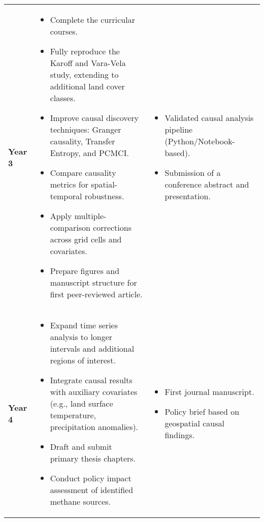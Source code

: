 \begin{longtable}{@{} >{\centering\arraybackslash}p{3cm} >{\centering\arraybackslash}p{8cm} >{\centering\arraybackslash}p{3cm} @{}}
\addlinespace[0.8em]
\textbf{Year 3} & 
\begin{minipage}[t]{8cm}\centering
\begin{itemize}[left=0pt, labelsep=4pt, itemsep=2pt]
    \item Complete the curricular courses.
    \item Fully reproduce the Karoff and Vara-Vela study, extending to additional land cover classes.
    \item Improve causal discovery techniques: Granger causality, Transfer Entropy, and PCMCI.
    \item Compare causality metrics for spatial-temporal robustness.
    \item Apply multiple-comparison corrections across grid cells and covariates.
    \item Prepare figures and manuscript structure for first peer-reviewed article.
\end{itemize}
\end{minipage} &
\begin{minipage}[t]{3cm}\centering
\begin{itemize}[left=0pt, labelsep=4pt, itemsep=2pt]
    \item Validated causal analysis pipeline (Python/Notebook-based).
    \item Submission of a conference abstract and presentation.
\end{itemize}
\end{minipage} \\

\addlinespace[0.8em]
\textbf{Year 4} & 
\begin{minipage}[t]{8cm}\centering
\begin{itemize}[left=0pt, labelsep=4pt, itemsep=2pt]
    \item Expand time series analysis to longer intervals and additional regions of interest.
    \item Integrate causal results with auxiliary covariates (e.g., land surface temperature, precipitation anomalies).
    \item Draft and submit primary thesis chapters.
    \item Conduct policy impact assessment of identified methane sources.
\end{itemize}
\end{minipage} &
\begin{minipage}[t]{3cm}\centering
\begin{itemize}[left=0pt, labelsep=4pt, itemsep=2pt]
    \item First journal manuscript.
    \item Policy brief based on geospatial causal findings.
\end{itemize}
\end{minipage} \\


\end{longtable}
